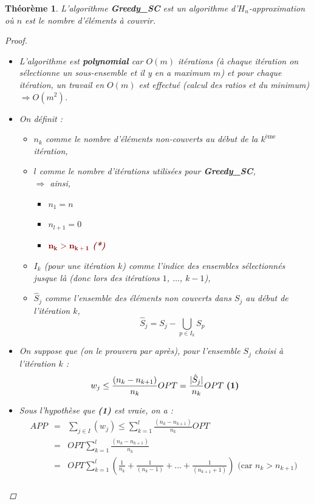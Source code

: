 \documentclass{article}
\newcommand{\rouge}[1]{\textcolor{darkred}{#1}}
\newtheorem{thm}{Th\'eor\`eme}[section]
\newtheorem{proof}{Preuve}[section]
\begin{document}
\begin{sffamily}
\begin{thm}L'algorithme \textbf{Greedy\_SC} est un algorithme d'$H_n$-approximation où $n$ est le nombre d'éléments à couvrir.
\begin{proof}$ $\\
\begin{itemize}
\item L'algorithme est \textbf{polynomial} car $O(m)$ itérations (à chaque itération on sélectionne un sous-ensemble et il y en a maximum 
$m$) et pour chaque itération, un travail en $O(m)$ est effectué (calcul des ratios et du minimum) $\Rightarrow O(m^2)$.
\item On définit :
	\begin{itemize}
	\item[$\blacktriangle$] $n_k$ comme le nombre d'éléments non-couverts au début de la $k^{\text{ème}}$ itération,
	\item[$\blacktriangle$] $l$ comme le nombre d'itérations utilisées pour \textbf{Greedy\_SC},\\
	$\Rightarrow$ ainsi, 
		\begin{itemize}
		\item[$\vartriangle$] $n_1 = n$
		\item[$\vartriangle$] $n_{l+1} = 0$
		\item[\rouge{$\blacktriangle$}] \rouge{$\mathbf{n_k > n_{k+1}}$ \textbf{(*)}}
		\end{itemize}
	\item[$\blacktriangle$] $I_k$ (pour une itération $k$) comme l'indice des ensembles sélectionnés jusque là (donc lors des itérations 
	$1$, $\ldots$, $k-1$),
	\item[$\blacktriangle$] $\hat{S}_j$ comme l'ensemble des éléments non couverts dans $S_j$ au début de l'itération $k$, 
	$$\hat{S}_j = S_j - \bigcup_{p\in I_k}{S_p}$$
	\end{itemize}
\item On suppose que (on le prouvera par après), pour l'ensemble $S_j$ choisi à l'itération $k$ :
$$ w_j \leq \frac{(n_k - n_{k+1})}{n_k}OPT = \frac{|\hat{S}_j|}{n_k}OPT\ \text{\textbf{(1)}}$$
\item Sous l'hypothèse que \textbf{(1)} est vraie, on a :
$$ \begin{eqnarray}
APP & = & \sum_{j\in I}(w_j) \leq \sum_{k=1}^l \frac{(n_k -n_{k+1})}{n_k}OPT\\
	& = & OPT \sum_{k=1}^l \frac{(n_k -n_{k+1})}{n_k}\\
	& = & OPT \sum_{k=1}^l \left(\frac{1}{n_k} + \frac{1}{(n_k-1)} +\ldots + \frac{1}{(n_{k+1}+1)}\right)\text{ (car $n_k > n_{k+1}$) }\\

\end{eqnarray}$$
\end{itemize}
\end{proof}
\end{thm}
\end{sffamily}
\end{document}
